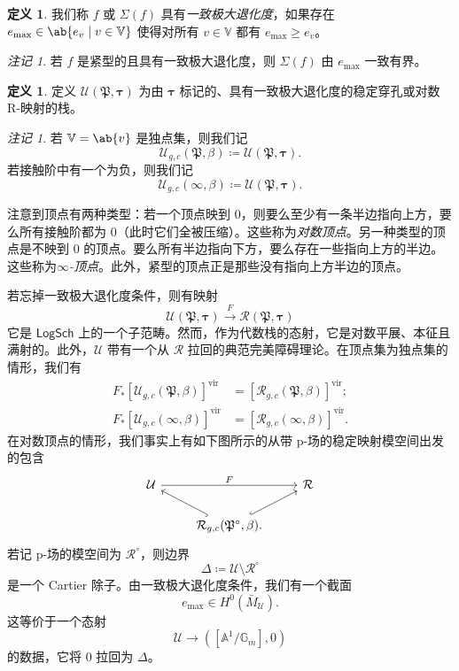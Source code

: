 \documentclass{amsart}
\theoremstyle{definition}
\newtheorem{defn}[thm]{定义}
\theoremstyle{remark}
\newtheorem{rmk}[thm]{注记}
\theoremstyle{plain}
\theoremstyle{definition}
\theoremstyle{remark}
\newcommand{\A}{\mathbb{A}}
\newcommand{\G}{\mathbb{G}}
\newcommand{\V}{\mathbb{V}}
\newcommand{\mc}[1]{\mathcal{#1}}
\newcommand{\mf}[1]{\mathfrak{#1}}
\newcommand{\mr}[1]{\mathrm{#1}}
\newcommand{\ms}[1]{\mathsf{#1}}
\newcommand{\1}{\mathbf{1}}
\newcommand{\2}{\mathbf{2}}
\newcommand{\3}{\mathbf{3}}
\newcommand{\vir}{\mr{vir}}
\begin{document}
\begin{defn}
    我们称 \(f\) 或 \(\Sigma(f)\) 具有\textit{一致极大退化度}，如果存在 \(e_{\max} \in \ab\{e_v \mid v \in \V \}\) 使得对所有 \(v \in \V\) 都有 \(e_{\max} \geq e_v\)。
\end{defn}

\begin{rmk}
    若 \(f\) 是紧型的且具有一致极大退化度，则 \(\Sigma(f)\) 由 \(e_{\max}\) 一致有界。
\end{rmk}

\begin{defn}
    定义 \(\mc{U}(\mf{P}, \bm{\tau})\) 为由 \(\bm{\tau}\) 标记的、具有一致极大退化度的稳定穿孔或对数 R-映射的栈。
\end{defn}

\begin{rmk}
    若 \(\V = \ab\{v\}\) 是独点集，则我们记
    \[ \mc{U}_{g, c}(\mf{P}, \beta) \coloneqq \mc{U}(\mf{P}, \bm{\tau}). \]
    若接触阶中有一个为负，则我们记
    \[ \mc{U}_{g, c}(\infty, \beta) \coloneqq \mc{U}(\mf{P}, \bm{\tau}). \]
\end{rmk}

注意到顶点有两种类型：若一个顶点映到 \(0\)，则要么至少有一条半边指向上方，要么所有接触阶都为 \(0\)（此时它们全被压缩）。这些称为\textit{对数顶点}。另一种类型的顶点是不映到 \(0\) 的顶点。要么所有半边指向下方，要么存在一些指向上方的半边。这些称为\textit{\(\infty\)-顶点}。此外，紧型的顶点正是那些没有指向上方半边的顶点。

若忘掉一致极大退化度条件，则有映射
\[ \mc{U}(\mf{P}, \bm{\tau}) \xrightarrow{F} \mc{R}(\mf{P}, \bm{\tau}) \]
它是 \(\ms{LogSch}\) 上的一个子范畴。然而，作为代数栈的态射，它是对数平展、本征且满射的。此外，\(\mc{U}\) 带有一个从 \(\mc{R}\) 拉回的典范完美障碍理论。在顶点集为独点集的情形，我们有
\begin{align*}
    F_* [\mc{U}_{g, c}(\mf{P}, \beta)]^{\vir} &= [\mc{R}_{g, c}(\mf{P}, \beta)]^{\vir}; \\
    F_* [\mc{U}_{g, c}(\infty, \beta)]^{\vir} &= [\mc{R}_{g, c}(\infty, \beta)]^{\vir}.
\end{align*}
在对数顶点的情形，我们事实上有如下图所示的从带 p-场的稳定映射模空间出发的包含
\begin{equation*}
\begin{tikzcd}
    \mc{U} \ar{rr}{F} & & \mc{R} \\
    & \mc{R}_{g,c}(\mf{P}^{\circ}, \beta) \ar[hookrightarrow]{ul} \ar[hookrightarrow]{ur}.
\end{tikzcd}
\end{equation*}
若记 p-场的模空间为 \(\mc{R}^{\circ}\)，则边界
\[ \Delta \coloneqq \mc{U} \setminus \mc{R}^{\circ} \]
是一个 Cartier 除子。由一致极大退化度条件，我们有一个截面
\[ e_{\max} \in H^0(\bar{M}_{\mc{U}}). \]
这等价于一个态射
\[ \mc{U} \to ([\A^1/\G_m], 0) \]
的数据，它将 \(0\) 拉回为 \(\Delta\)。
\end{document}
